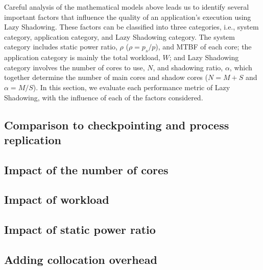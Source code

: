 Careful analysis of the mathematical models above leads us to identify several important factors that influence the quality of an application's execution using Lazy Shadowing. These factors can be classified into three categories, i.e., system category, application category, and Lazy Shadowing category. The system category includes static power ratio, $\rho$ ($\rho=p_s/p$), and MTBF of each core; the application category is mainly the total workload, $W$; and Lazy Shadowing category involves the number of cores to use, $N$, and shadowing ratio, $\alpha$, which together determine the number of main cores and shadow cores ($N=M+S$ and $\alpha=M/S$). In this section, we evaluate each performance metric of Lazy Shadowing, 
 with the influence of each of the factors considered. %

%

%

%

\subsection{Comparison to checkpointing and process replication}
\label{eval_comparison}


\subsection{Impact of the number of cores}
\label{eval_core}


\subsection{Impact of workload}
\label{eval_workload}


\subsection{Impact of static power ratio}
\label{eval_static_power}


\subsection{Adding collocation overhead}
\label{eval_collocation}

